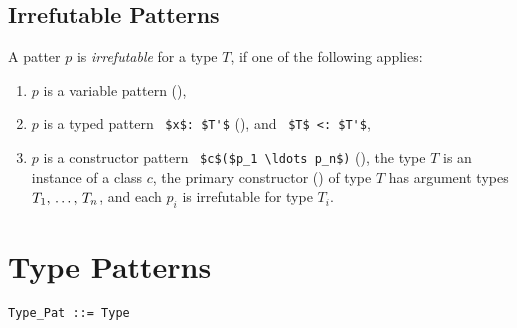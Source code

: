 \subsection{Irrefutable Patterns}
\label{sec:irrefutable-patterns}

A patter $p$ is {\em irrefutable} for a type $T$, if one of the following applies: 
\begin{enumerate}
\item $p$ is a variable pattern (),
\item $p$ is a typed pattern ~\lstinline!$x$: $T'$! (), and ~\lstinline!$T$ <: $T'$!,
\item $p$ is a constructor pattern ~\lstinline!$c$($p_1 \ldots p_n$)! (), the type $T$ is an instance of a class $c$, the primary constructor () of type $T$ has argument types $T_1 ,\, \ldots ,\, T_n$, and each $p_i$ is irrefutable for type $T_i$. 
\end{enumerate}






\section{Type Patterns}
\label{sec:type-patterns}

\syntax\begin{lstlisting}
Type_Pat ::= Type
\end{lstlisting}

